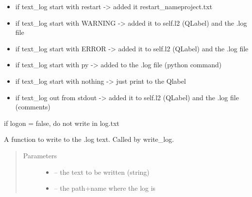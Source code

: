 \documentclass[letterpaper,10pt,english]{sphinxmanual}
\begin{document}
\begin{fulllineitems}
\begin{fulllineitems}
\begin{itemize}
\item {} 
if text\_log start with restart -\textgreater{} added it restart\_nameproject.txt

\item {} 
if text\_log start with WARNING -\textgreater{} added it to self.l2 (QLabel) and the .log file

\item {} 
if text\_log start with ERROR -\textgreater{} added it to self.l2 (QLabel) and the .log file

\item {} 
if text\_log start with py -\textgreater{} added to the .log file (python command)

\item {} 
if text\_log start with nothing -\textgreater{} just print to the Qlabel

\item {} 
if text\_log out from stdout -\textgreater{} added it to self.l2 (QLabel) and the .log file (comments)

\end{itemize}

if logon = false, do not write in log.txt

\end{fulllineitems}


\begin{fulllineitems}
\label{\detokenize{index:src_GUI.Main_windows_1.CentralW.write_log_file}}
A function to write to the .log text. Called by write\_log.
\begin{quote}\begin{description}
\item[{Parameters}] \leavevmode\begin{itemize}
\item {} 
 -- the text to be written (string)

\item {} 
 -- the path+name where the log is

\end{itemize}

\end{description}\end{quote}

\end{fulllineitems}


\end{fulllineitems}
\end{document}
